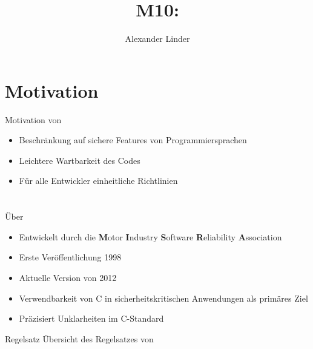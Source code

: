 \documentclass{beamer}
\title{M10: \sqss}
\author[Linder]{Alexander Linder}
\date{} %
\institute{FAKULTÄT FÜR INFORMATIK}
\begin{document}

    \begin{frame}
        \maketitle
    \end{frame}

    \begin{frame}
        \tableofcontents
    \end{frame}

    \section{Motivation}
    \label{sec:motivation}
    \begin{frame}{Motivation von \sqss}
        \begin{itemize}
            \item Beschränkung auf sichere Features von Programmiersprachen
            \item Leichtere Wartbarkeit des Codes
            \item Für alle Entwickler einheitliche Richtlinien
        \end{itemize}
    \end{frame}

    \section{\misra}
    \label{sec:misra-c}
    \begin{frame}{Über \misra}
        \begin{itemize}
            \item Entwickelt durch die \textbf{M}otor \textbf{I}ndustry \textbf{S}oftware \textbf{R}eliability \textbf{A}ssociation
            \item Erste Veröffentlichung 1998
            \item Aktuelle Version von 2012
            \item Verwendbarkeit von C in sicherheitskritischen Anwendungen als primäres Ziel
            \item Präzisiert Unklarheiten im C-Standard
        \end{itemize}
    \end{frame}

    \begin{frame}{Regelsatz}
        Übersicht des Regelsatzes von \misra\
    \end{frame}
\end{document}
